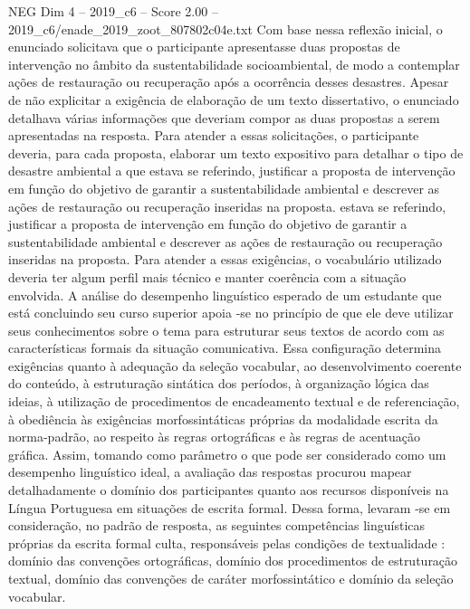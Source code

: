 \begin{textsample}{NEG Dim 4 – 2019\_c6 – Score 2.00 – 2019\_c6/enade\_2019\_zoot\_807802c04e.txt}
Com base nessa reflexão inicial, o enunciado solicitava que o participante apresentasse duas propostas de intervenção no âmbito da sustentabilidade socioambiental, de modo a contemplar ações de restauração ou recuperação após a ocorrência desses desastres.
Apesar de não explicitar a exigência de elaboração de um texto dissertativo, o enunciado detalhava várias informações que deveriam compor as duas propostas a serem apresentadas na resposta.
Para atender a essas solicitações, o participante deveria, para cada proposta, elaborar um texto expositivo para detalhar o tipo de desastre ambiental a que estava se referindo, justificar a proposta de intervenção em função do objetivo de garantir a sustentabilidade ambiental e descrever as ações de restauração ou recuperação inseridas na proposta. estava se referindo, justificar a proposta de intervenção em função do objetivo de garantir a sustentabilidade ambiental e descrever as ações de restauração ou recuperação inseridas na proposta.
Para atender a essas exigências, o vocabulário utilizado deveria ter algum perfil mais técnico e manter coerência com a situação envolvida.
A análise do desempenho linguístico esperado de um estudante que está concluindo seu curso superior apoia -se no princípio de que ele deve utilizar seus conhecimentos sobre o tema para estruturar seus textos de acordo com as características formais da situação comunicativa.
Essa configuração determina exigências quanto à adequação da seleção vocabular, ao desenvolvimento coerente do conteúdo, à estruturação sintática dos períodos, à organização lógica das ideias, à utilização de procedimentos de encadeamento textual e de referenciação, à obediência às exigências morfossintáticas próprias da modalidade escrita da norma-padrão, ao respeito às regras ortográficas e às regras de acentuação gráfica.
Assim, tomando como parâmetro o que pode ser considerado como um desempenho linguístico ideal, a avaliação das respostas procurou mapear detalhadamente o domínio dos participantes quanto aos recursos disponíveis na Língua Portuguesa em situações de escrita formal.
Dessa forma, levaram -se em consideração, no padrão de resposta, as seguintes competências linguísticas próprias da escrita formal culta, responsáveis pelas condições de textualidade : domínio das convenções ortográficas, domínio dos procedimentos de estruturação textual, domínio das convenções de caráter morfossintático e domínio da seleção vocabular.

\end{textsample}
